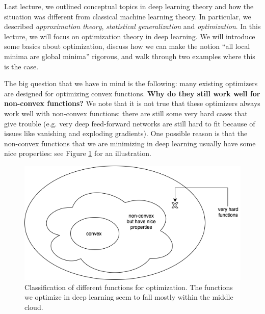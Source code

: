 \setcounter{section}{0}



Last lecture, we outlined conceptual topics in deep learning theory and how the situation was different from classical machine learning theory. In particular, we described \textit{approximation theory}, \textit{statistical generalization} and \textit{optimization}. In this lecture, we will focus on optimization theory in deep learning. We will introduce some basics about optimization, discuss how we can make the notion ``all local minima are global minima'' rigorous, and walk through two examples where this is the case.


The big question that we have in mind is the following: many existing optimizers are designed for optimizing convex functions. \textbf{Why do they still work well for non-convex functions?} We note that it is not true that these optimizers always work well with non-convex functions: there are still some very hard cases that give trouble (e.g. very deep feed-forward networks are still hard to fit because of issues like vanishing and exploding gradients). One possible reason is that the non-convex functions that we are minimizing in deep learning usually have some nice properties: see Figure \ref{lec10:fig:optimization} for an illustration.

\begin{figure}[H]
    \centering
    \includegraphics[scale = 0.5]{figures/landscape.png}
    \caption{Classification of different functions for optimization. The functions we optimize in deep learning seem to fall mostly within the middle cloud.}
    \label{lec10:fig:optimization}
\end{figure}

